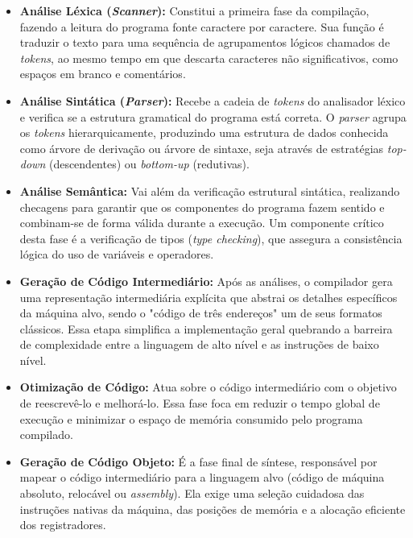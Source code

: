 \begin{itemize}
    \item \textbf{Análise Léxica (\textit{Scanner}):} Constitui a primeira fase da compilação, fazendo a leitura do programa fonte caractere por caractere.
    Sua função é traduzir o texto para uma sequência de agrupamentos lógicos chamados de \textit{tokens}, ao mesmo tempo em que descarta caracteres não significativos, como espaços em branco e comentários.

    \item \textbf{Análise Sintática (\textit{Parser}):} Recebe a cadeia de \textit{tokens} do analisador léxico e verifica se a estrutura gramatical do programa está correta.
    O \textit{parser} agrupa os \textit{tokens} hierarquicamente, produzindo uma estrutura de dados conhecida como árvore de derivação ou árvore de sintaxe, seja através de estratégias \textit{top-down} (descendentes) ou \textit{bottom-up} (redutivas).

    \item \textbf{Análise Semântica:} Vai além da verificação estrutural sintática, realizando checagens para garantir que os componentes do programa fazem sentido e combinam-se de forma válida durante a execução.
    Um componente crítico desta fase é a verificação de tipos (\textit{type checking}), que assegura a consistência lógica do uso de variáveis e operadores.

    \item \textbf{Geração de Código Intermediário:} Após as análises, o compilador gera uma representação intermediária explícita que abstrai os detalhes específicos da máquina alvo, sendo o "código de três endereços" um de seus formatos clássicos.
    Essa etapa simplifica a implementação geral quebrando a barreira de complexidade entre a linguagem de alto nível e as instruções de baixo nível.

    \item \textbf{Otimização de Código:} Atua sobre o código intermediário com o objetivo de reescrevê-lo e melhorá-lo.
    Essa fase foca em reduzir o tempo global de execução e minimizar o espaço de memória consumido pelo programa compilado.

    \item \textbf{Geração de Código Objeto:} É a fase final de síntese, responsável por mapear o código intermediário para a linguagem alvo (código de máquina absoluto, relocável ou \textit{assembly}).
    Ela exige uma seleção cuidadosa das instruções nativas da máquina, das posições de memória e a alocação eficiente dos registradores.
\end{itemize}

